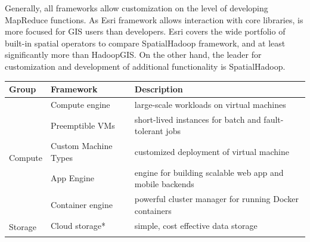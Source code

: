 \documentclass[a4paper,12pt,oneside]{report}
\begin{document}
Generally, all frameworks allow customization on the level of developing MapReduce functions. As Esri 
framework allows interaction with core libraries, is more focused  for GIS users than developers. 
Esri covers the wide portfolio of built-in spatial operators to compare SpatialHadoop framework, 
and at least significantly more than HadoopGIS. On the other hand, the leader for customization and 
development of additional functionality is SpatialHadoop.


\begin{table}[!htbp]
\begin{scriptsize}
\centering
\begin{tabular}{@{}|l||l|l|@{}}
\toprule
Group                       & Framework                                                        & Description                                                                                                                                                  \\ \midrule \midrule
\multirow{5}{*}{Compute}    & Compute engine                                                   & large-scale workloads on virtual machines                                                                                                                \\ \cmidrule(l){2-3} 
                            & Preemptible VMs                                                  & short-lived instances for batch and fault-tolerant jobs                                                                                                  \\ \cmidrule(l){2-3} 
                            & Custom Machine Types                                             & customized deployment of virtual machine                                                                                                                 \\ \cmidrule(l){2-3} 
                            & App Engine                                                       & engine for building scalable web app and mobile backends                                                                                                 \\ \cmidrule(l){2-3} 
                            & Container engine                                                 & powerful cluster manager for running Docker containers                                                                                                   \\ \midrule
\multirow{5}{*}{Storage}    & Cloud storage*                                                   & simple, cost effective data storage                                                                                                                       \\ \cmidrule(l){2-3} 

\end{tabular}
\end{scriptsize}
\end{table}
\end{document}
